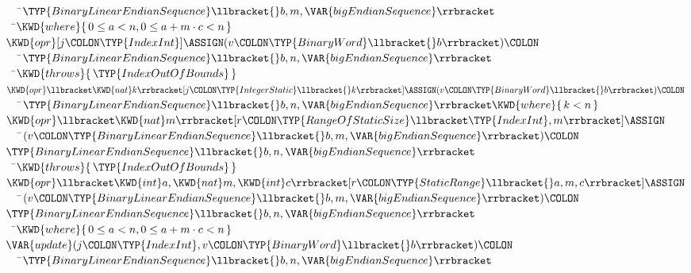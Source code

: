 \begin{Fortress}
{\tt~~~}\pushtabs\=\+\(     \TYP{BinaryLinearEndianSequence}\llbracket{}b,m,\VAR{bigEndianSequence}\rrbracket\)\-\\\poptabs
{\tt~~}\pushtabs\=\+\(    \KWD{where} \{\,0 \leq a < n, 0 \leq a + m \cdot c < n\,\}\)\-\\\poptabs
\(  \KWD{opr} [j\COLON \TYP{IndexInt}] \ASSIGN (v\COLON \TYP{BinaryWord}\llbracket{}b\rrbracket)\COLON \)\\
{\tt~~~}\pushtabs\=\+\(     \TYP{BinaryLinearEndianSequence}\llbracket{}b,n,\VAR{bigEndianSequence}\rrbracket\)\-\\\poptabs
{\tt~~}\pushtabs\=\+\(    \KWD{throws} \{\,\TYP{IndexOutOfBounds}\,\}\)\-\\\poptabs
\(  \KWD{opr} \llbracket\KWD{nat} k\rrbracket [j\COLON \TYP{IntegerStatic}\llbracket{}k\rrbracket] \ASSIGN (v\COLON \TYP{BinaryWord}\llbracket{}b\rrbracket)\COLON \)\\
{\tt~~~}\pushtabs\=\+\(     \TYP{BinaryLinearEndianSequence}\llbracket{}b,n,\VAR{bigEndianSequence}\rrbracket \KWD{where} \{\,k < n\,\}\)\-\\\poptabs
\(  \KWD{opr} \llbracket\KWD{nat} m\rrbracket[r\COLON \TYP{RangeOfStaticSize}\llbracket\TYP{IndexInt},m\rrbracket] \ASSIGN\)\\
{\tt~~~}\pushtabs\=\+\(     (v\COLON \TYP{BinaryLinearEndianSequence}\llbracket{}b,m,\VAR{bigEndianSequence}\rrbracket)\COLON \)\\
\(     \TYP{BinaryLinearEndianSequence}\llbracket{}b,n,\VAR{bigEndianSequence}\rrbracket\)\-\\\poptabs
{\tt~~}\pushtabs\=\+\(    \KWD{throws} \{\,\TYP{IndexOutOfBounds}\,\}\)\-\\\poptabs
\(  \KWD{opr} \llbracket\KWD{int} a,\KWD{nat} m,\KWD{int} c\rrbracket[r\COLON \TYP{StaticRange}\llbracket{}a,m,c\rrbracket] \ASSIGN\)\\
{\tt~~~}\pushtabs\=\+\(     (v\COLON \TYP{BinaryLinearEndianSequence}\llbracket{}b,m,\VAR{bigEndianSequence}\rrbracket)\COLON \)\\
\(     \TYP{BinaryLinearEndianSequence}\llbracket{}b,n,\VAR{bigEndianSequence}\rrbracket\)\-\\\poptabs
{\tt~~}\pushtabs\=\+\(    \KWD{where} \{\,0 \leq a < n, 0 \leq a + m \cdot c < n\,\}\)\-\\\poptabs
\(  \VAR{update}(j\COLON \TYP{IndexInt}, v\COLON \TYP{BinaryWord}\llbracket{}b\rrbracket)\COLON \)\\
{\tt~~~}\pushtabs\=\+\(     \TYP{BinaryLinearEndianSequence}\llbracket{}b,n,\VAR{bigEndianSequence}\rrbracket\)\-\\\poptabs

\end{Fortress}
